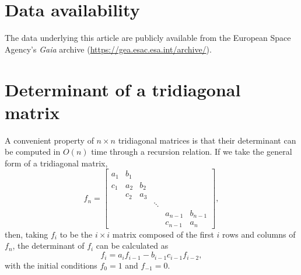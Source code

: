 \documentclass[fleqn,usenatbib]{mnras}
\newcommand{\gaia}{{\it Gaia}\xspace}
\begin{document}
\section*{Data availability}
The data underlying this article are publicly available from the European Space Agency's \gaia archive (\url{https://gea.esac.esa.int/archive/}). 











\FloatBarrier

\appendix

\section{Determinant of a tridiagonal matrix}
\label{sec:tridiagonal}

A convenient property of $n \times n$ tridiagonal matrices is that their determinant can be computed in $O(n)$ time through a recursion relation. If we take the general form of a tridiagonal matrix,
\begin{equation}
    f_n = 
    \begin{bmatrix}
    a_1 & b_1 &\\
    c_1 & a_2 & b_2 & \\
    & c_2 & a_3 & & \\
    & & & \ddots &\\
    & &  &  & a_{n-1} & b_{n-1} \\
    & &  &  & c_{n-1} & a_n
    \end{bmatrix},
\end{equation}
then, taking $f_i$ to be the $i \times i$ matrix composed of the first $i$ rows and columns of $f_n$, the determinant of $f_i$ can be calculated as
\begin{equation}
    f_i = a_if_{i-1}-b_{i-1}c_{i-1}f_{i-2},
\end{equation}
with the initial conditions $f_0=1$ and $f_{-1}=0$.
\end{document}
